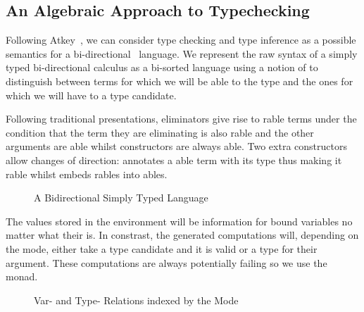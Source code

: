 \subsection{An Algebraic Approach to Typechecking}\label{section:typechecking}

Following Atkey~\citeyear{atkey2015algebraic}, we can consider type checking
and type inference as a possible semantics for a bi-directional~\cite{pierce2000local}
language. We represent the raw syntax of a simply typed bi-directional calculus
as a bi-sorted language using a notion of  to distinguish between terms
for which we will be able to  the type and the ones for which we will
have to  a type candidate.

Following traditional presentations, eliminators give rise to rable
terms under the condition that the term they are eliminating is also rable
and the other arguments are able whilst constructors are always able.
Two extra constructors allow changes of direction:  annotates a able
term with its type thus making it rable whilst  embeds rables
into ables.

\begin{figure}[h]
\begin{minipage}{0.35\textwidth}
\end{minipage}
\begin{minipage}{0.55\textwidth}
\end{minipage}
\caption{A Bidirectional Simply Typed Language}
\end{figure}

The values stored in the environment will be  information for bound
variables no matter what their  is. In constrast, the generated
computations will, depending on the mode, either take a type candidate and
 it is valid or  a type for their argument. These
computations are always potentially failing so we use the  monad.

\begin{figure}[h]
\begin{minipage}{0.40\textwidth}
\end{minipage}
\begin{minipage}{0.50\textwidth}
\end{minipage}
\caption{Var- and Type- Relations indexed by the Mode}
\end{figure}

